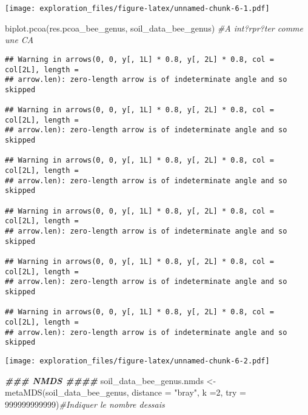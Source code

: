 \documentclass[
]{article}
\newenvironment{Shaded}{\begin{snugshade}}{\end{snugshade}}
\newcommand{\AttributeTok}[1]{\textcolor[rgb]{0.77,0.63,0.00}{#1}}
\newcommand{\CommentTok}[1]{\textcolor[rgb]{0.56,0.35,0.01}{\textit{#1}}}
\newcommand{\DecValTok}[1]{\textcolor[rgb]{0.00,0.00,0.81}{#1}}
\newcommand{\DocumentationTok}[1]{\textcolor[rgb]{0.56,0.35,0.01}{\textbf{\textit{#1}}}}
\newcommand{\FunctionTok}[1]{\textcolor[rgb]{0.00,0.00,0.00}{#1}}
\newcommand{\NormalTok}[1]{#1}
\newcommand{\OtherTok}[1]{\textcolor[rgb]{0.56,0.35,0.01}{#1}}
\newcommand{\StringTok}[1]{\textcolor[rgb]{0.31,0.60,0.02}{#1}}
\begin{document}
\texttt{[image: exploration\_files/figure-latex/unnamed-chunk-6-1.pdf]}

\begin{Shaded}
\begin{Highlighting}[]
\FunctionTok{biplot.pcoa}\NormalTok{(res.pcoa\_bee\_genus, soil\_data\_bee\_genus) }\CommentTok{\#A int?rpr?ter comme une CA}
\end{Highlighting}
\end{Shaded}

\begin{verbatim}
## Warning in arrows(0, 0, y[, 1L] * 0.8, y[, 2L] * 0.8, col = col[2L], length =
## arrow.len): zero-length arrow is of indeterminate angle and so skipped

## Warning in arrows(0, 0, y[, 1L] * 0.8, y[, 2L] * 0.8, col = col[2L], length =
## arrow.len): zero-length arrow is of indeterminate angle and so skipped

## Warning in arrows(0, 0, y[, 1L] * 0.8, y[, 2L] * 0.8, col = col[2L], length =
## arrow.len): zero-length arrow is of indeterminate angle and so skipped

## Warning in arrows(0, 0, y[, 1L] * 0.8, y[, 2L] * 0.8, col = col[2L], length =
## arrow.len): zero-length arrow is of indeterminate angle and so skipped

## Warning in arrows(0, 0, y[, 1L] * 0.8, y[, 2L] * 0.8, col = col[2L], length =
## arrow.len): zero-length arrow is of indeterminate angle and so skipped

## Warning in arrows(0, 0, y[, 1L] * 0.8, y[, 2L] * 0.8, col = col[2L], length =
## arrow.len): zero-length arrow is of indeterminate angle and so skipped
\end{verbatim}

\texttt{[image: exploration\_files/figure-latex/unnamed-chunk-6-2.pdf]}

\begin{Shaded}
\begin{Highlighting}[]
\DocumentationTok{\#\#\# NMDS \#\#\#\#}
\NormalTok{soil\_data\_bee\_genus.nmds }\OtherTok{\textless{}{-}} \FunctionTok{metaMDS}\NormalTok{(soil\_data\_bee\_genus, }\AttributeTok{distance =} \StringTok{"bray"}\NormalTok{, }\AttributeTok{k =}\DecValTok{2}\NormalTok{, }\AttributeTok{try =} \DecValTok{999999999999}\NormalTok{)}\CommentTok{\#Indiquer le nombre d\textquotesingle{}essais}
\end{Highlighting}
\end{Shaded}
\end{document}
